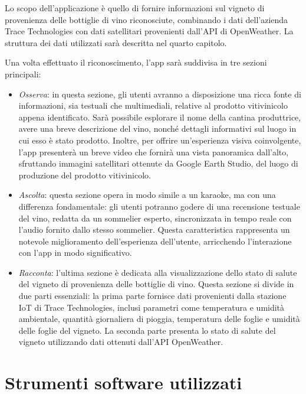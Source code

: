 Lo scopo dell'applicazione è quello di fornire informazioni sul vigneto di provenienza delle bottiglie di vino riconosciute, combinando i dati dell'azienda Trace Technologies con dati satellitari provenienti dall'API di OpenWeather. La struttura dei dati utilizzati sarà descritta nel quarto capitolo.

Una volta effettuato il riconoscimento, l'app sarà suddivisa in tre sezioni principali:

\begin{itemize}
    \item \textit{Osserva}: in questa sezione, gli utenti avranno a disposizione una ricca fonte di informazioni, sia testuali che multimediali, relative al prodotto vitivinicolo appena identificato. Sarà possibile esplorare il nome della cantina produttrice, avere una breve descrizione del vino, nonché dettagli informativi sul luogo in cui esso è stato prodotto. Inoltre, per offrire un'esperienza visiva coinvolgente, l'app presenterà un breve video che fornirà una vista panoramica dall'alto, sfruttando immagini satellitari ottenute da Google Earth Studio, del luogo di produzione del prodotto vitivinicolo.
    \item \textit{Ascolta}: questa sezione opera in modo simile a un karaoke, ma con una differenza fondamentale: gli utenti potranno godere di una recensione testuale del vino, redatta da un sommelier esperto, sincronizzata in tempo reale con l'audio fornito dallo stesso sommelier. Questa caratteristica rappresenta un notevole miglioramento dell'esperienza dell'utente, arricchendo l'interazione con l'app in modo significativo.
    \item \textit{Racconta}: l'ultima sezione è dedicata alla visualizzazione dello stato di salute del vigneto di provenienza delle bottiglie di vino. Questa sezione si divide in due parti essenziali: la prima parte fornisce dati provenienti dalla stazione IoT di Trace Technologies, inclusi parametri come temperatura e umidità ambientale, quantità giornaliera di pioggia, temperatura delle foglie e umidità delle foglie del vigneto. La seconda parte presenta lo stato di salute del vigneto utilizzando dati ottenuti dall'API OpenWeather.

\end{itemize}

\section{Strumenti software utilizzati}

